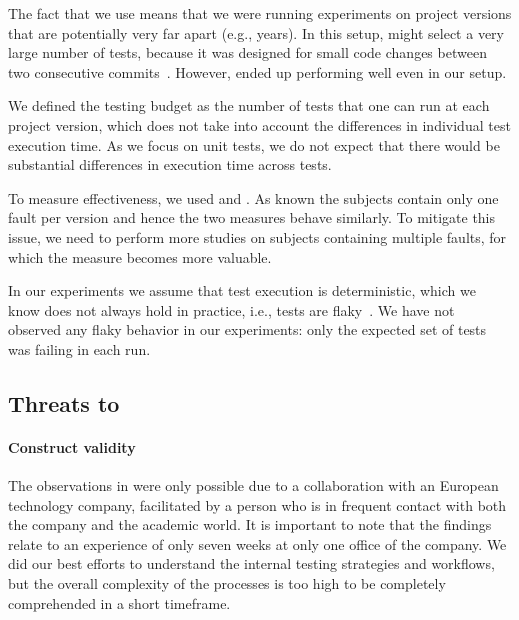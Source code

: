 The fact that we use \dfj means that we were running experiments on
project versions that are potentially very far apart (e.g., years).
In this setup, \ek might select a very large number of tests, because
it was designed for small code changes between two
consecutive commits~\cite{gligoricEk, vasic_file-level_2017}.  However, 
\ek ended up performing well
even in our setup.

We defined the testing budget as the number of tests that one can run
at each project version, which does not take into account the
differences in individual test execution time.  As we focus on unit
tests, we do not expect that there would be substantial differences in
execution time across tests.

To measure effectiveness, we used \ttff and \apfd. As known the \dfj subjects contain only one fault per version and hence the two measures behave similarly. 
To mitigate this issue, we need to perform more studies on subjects containing multiple faults, for which the \apfd measure becomes more valuable. 

In our experiments we assume that test execution is deterministic,
which we know  does not always hold in practice, i.e.,
tests are flaky~\cite{luo2014empirical,harman2018start}.
We have not observed any flaky behavior in our
experiments: only the expected set of tests was failing in each run.

\subsection{Threats to  }

\paragraph{Construct validity}
The observations in  were only possible due to a collaboration with an European technology company, facilitated by a person who is in frequent contact with both the company and the academic world.
It is important to note that the findings relate to an experience of only seven weeks at only one office of the company.
We did our best efforts to understand the internal testing strategies and workflows, but the overall complexity of the processes is too high to be completely comprehended in a short timeframe.

